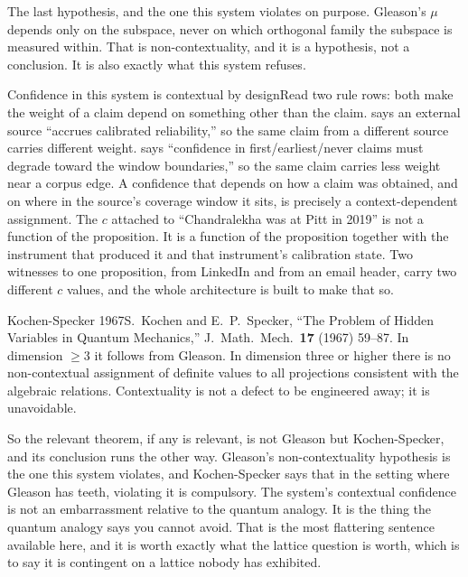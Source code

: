 The last hypothesis, and the one this system violates on purpose. Gleason's $\mu$ depends only on the subspace, never on which orthogonal family the subspace is measured within. That is non-contextuality, and it is a hypothesis, not a conclusion. It is also exactly what this system refuses.

\begin{Correspondence}{Confidence in this system is contextual by design}{Read two rule rows: both make the weight of a claim depend on something other than the claim.}
 says an external source ``accrues calibrated reliability,'' so the same claim from a different source carries different weight.  says ``confidence in first/earliest/never claims must degrade toward the window boundaries,'' so the same claim carries less weight near a corpus edge.
A confidence that depends on how a claim was obtained, and on where in the source's coverage window it sits, is precisely a context-dependent assignment. The $c$ attached to ``Chandralekha was at Pitt in 2019'' is not a function of the proposition. It is a function of the proposition together with the instrument that produced it and that instrument's calibration state. Two witnesses to one proposition, from LinkedIn and from an email header, carry two different $c$ values, and the whole architecture is built to make that so.
\end{Correspondence}

\begin{Theorem}{Kochen-Specker 1967}{S.\ Kochen and E.\ P.\ Specker, ``The Problem of Hidden Variables in Quantum Mechanics,'' J.\ Math.\ Mech.\ \textbf{17} (1967) 59--87. In dimension $\geq 3$ it follows from Gleason.}
In dimension three or higher there is no non-contextual assignment of definite values to all projections consistent with the algebraic relations. Contextuality is not a defect to be engineered away; it is unavoidable.
\end{Theorem}

So the relevant theorem, if any is relevant, is not Gleason but Kochen-Specker, and its conclusion runs the other way. Gleason's non-contextuality hypothesis is the one this system violates, and Kochen-Specker says that in the setting where Gleason has teeth, violating it is compulsory. The system's contextual confidence is not an embarrassment relative to the quantum analogy. It is the thing the quantum analogy says you cannot avoid. That is the most flattering sentence available here, and it is worth exactly what the lattice question is worth, which is to say it is contingent on a lattice nobody has exhibited.

